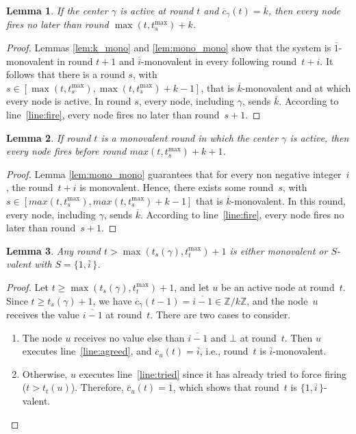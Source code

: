 \documentclass{article}
\newtheorem{lemma}{Lemma}[section]
\newcommand{\cent}{\gamma}
\newcommand{\try}{t_{t}}
\begin{document}
\begin{lemma}\label{lem:k_liv}
If the center $\cent$ is active at round $t$  and $\overline{c}_\cent(t) = \overline{k} $, 
	then every node fires no later than round $\max(t, t_s^{\max}) + k $.
\end{lemma}
\begin{proof}
Lemmas \ref{lem:k_mono} and \ref{lem:mono_mono} show that the system is $\overline{1}$-monovalent in round $t+1$
	and $\overline{i}$-monovalent in every  following round~$t+i$.
It follows that there is a round $ s $, with $ s \in [ \max ( t, t_s^{\max} )  , \max (t , t_s^{\max} ) + k  - 1] $,
	that  is $\overline{k}$-monovalent and at which every node is active.
In round $ s $, every node, including $\cent$, sends $ \overline{k} $.
According to line~\ref{line:fire}, every node fires no later than round~$s+1$.
\end{proof}
 
\begin{lemma}\label{lem:mono_liv}
If  round $t$ is a monovalent round in which the center $\cent$ is active, then 
	every node fires before round $max( t, t_s^{\max} )+k + 1$.
\end{lemma}
\begin{proof}
Lemma \ref{lem:mono_mono} guarantees that for every non negative integer~$i$,
	the round~$t +i$ is monovalent.   
Hence, there exists some round~$s$, with $ s \in [ max( t, t_s^{\max} ) , max( t, t_s^{\max} )+ k - 1 ] $ 
	that is  $\overline{k}$-monovalent.
In this round, every node, including $\cent$, sends $\overline{k}$.
According to line~\ref{line:fire}, every node fires no later than round~$s+1$.
\end{proof}


\begin{lemma}\label{lem:mono_bi}
Any round $t > \max (t_s(\cent), \try^{\max}) + 1$  is either monovalent or 
	$S$-valent with  $S = \{1, \overline{i} \, \}$.
\end{lemma}
\begin{proof}
Let $t \geq \max (t_s(\cent), \try^{\max}) + 1$, and let $u$ be an active node at round~$t$.
Since $t \geq t_s(\cent) +1$, we have $ \overline{c}_\cent(t - 1) = \overline{i -1 } \in \mathds{Z}/k\mathds{Z} $,
	and the node~$u$ receives the value $ \overline{i - 1}$ at round~$t$.
There are two cases to consider.
\begin{enumerate}
\item The node $u$ receives no value else than $\overline{i -1}$ and $\bot$ at round~$t$.
 Then $u$ executes line~\ref{line:agreed}, and $\overline{c}_u(t) = \overline{ i }$, i.e.,
 	round~$t$ is $ \overline{ i }$-monovalent.
\item Otherwise, $u$ executes line~\ref{line:tried} since it has already tried to force firing ($t > \try(u)$).
Therefore, $\overline{c}_u(t) = \overline{1}$, which shows that round~$t$ is $\{1, \overline{ i } \, \}$-valent.
\end{enumerate}
\end{proof}
\end{document}
